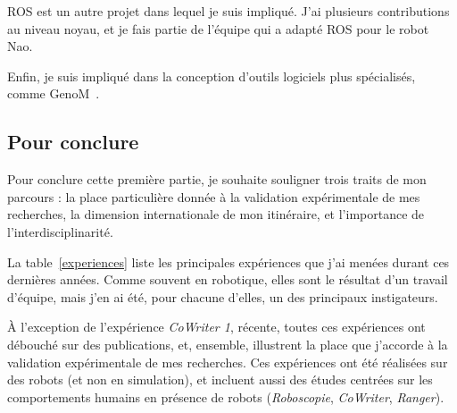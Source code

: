 \documentclass[a4paper]{article}
\begin{document}
ROS est un autre projet dans lequel je suis impliqué.  J'ai plusieurs
contributions au niveau noyau, et je fais partie de l'équipe qui a adapté ROS
pour le robot Nao.

Enfin, je suis impliqué dans la conception d'outils logiciels plus spécialisés,
comme GenoM~\cite{mallet2010genom3}.

\subsection{Pour conclure}

Pour conclure cette première partie, je souhaite souligner trois traits de mon
parcours : la place particulière donnée à la validation expérimentale de mes
recherches, la dimension internationale de mon itinéraire, et l'importance de
l'interdisciplinarité.

La table~\ref{experiences} liste les principales expériences que j'ai menées
durant ces dernières années. Comme souvent en robotique, elles sont le résultat
d'un travail d'équipe, mais j'en ai été, pour chacune d'elles, un des
principaux instigateurs.

À l'exception de l'expérience \emph{CoWriter 1}, récente, toutes ces expériences
ont débouché sur des publications, et, ensemble, illustrent la place que
j'accorde à la validation expérimentale de mes recherches. Ces expériences ont
été réalisées sur des robots (et non en simulation), et incluent aussi des
études centrées sur les comportements humains en présence de robots
(\emph{Roboscopie}, \emph{CoWriter}, \emph{Ranger}).
\end{document}
